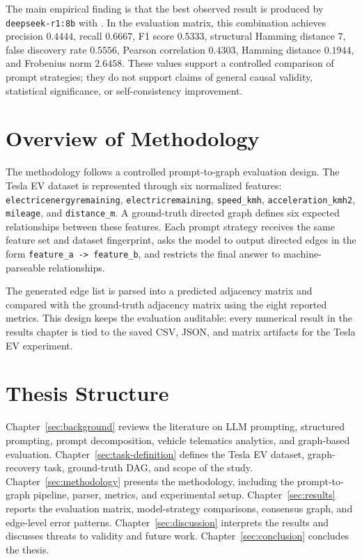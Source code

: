 The main empirical finding is that the best observed result is produced by
\texttt{deepseek-r1:8b} with
. In the evaluation matrix, this
combination achieves precision \(0.4444\), recall \(0.6667\), F1 score
\(0.5333\), structural Hamming distance \(7\), false discovery rate
\(0.5556\), Pearson correlation \(0.4303\), Hamming distance \(0.1944\), and
Frobenius norm \(2.6458\). These values support a controlled comparison of
prompt strategies; they do not support claims of general causal validity,
statistical significance, or self-consistency improvement.

\section{Overview of Methodology}

The methodology follows a controlled prompt-to-graph evaluation design. The
Tesla EV dataset is represented through six normalized features:
\texttt{electricenergyremaining}, \texttt{electricremaining},
\texttt{speed\_kmh}, \texttt{acceleration\_kmh2}, \texttt{mileage}, and
\texttt{distance\_m}. A ground-truth directed graph defines six expected
relationships between these features. Each prompt strategy receives the same
feature set and dataset fingerprint, asks the model to output directed edges
in the form \texttt{feature\_a -> feature\_b}, and restricts the final answer
to machine-parseable relationships.

The generated edge list is parsed into a predicted adjacency matrix and
compared with the ground-truth adjacency matrix using the eight reported
metrics. This design keeps the evaluation auditable: every numerical result
in the results chapter is tied to the saved CSV, JSON, and matrix artifacts
for the Tesla EV experiment.

\section{Thesis Structure}

Chapter~\ref{sec:background} reviews the literature on LLM prompting,
structured prompting, prompt decomposition, vehicle telematics analytics, and
graph-based evaluation. Chapter~\ref{sec:task-definition} defines the Tesla
EV dataset, graph-recovery task, ground-truth DAG, and scope of the study.
Chapter~\ref{sec:methodology} presents the methodology, including the
prompt-to-graph pipeline, parser, metrics, and experimental setup.
Chapter~\ref{sec:results} reports the evaluation matrix, model-strategy
comparisons, consensus graph, and edge-level error patterns.
Chapter~\ref{sec:discussion} interprets the results and discusses threats to
validity and future work. Chapter~\ref{sec:conclusion} concludes the thesis.
